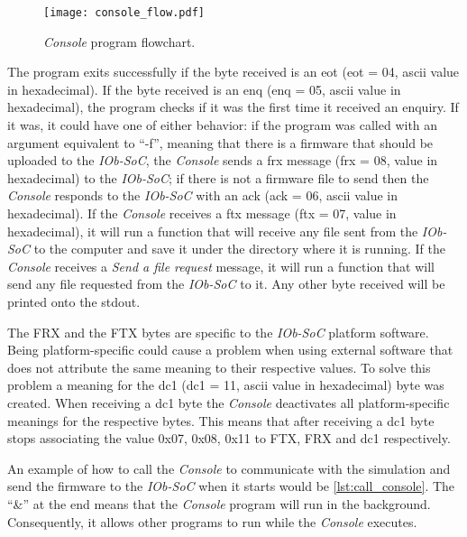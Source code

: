 \begin{figure}[!ht]
    \centering
    \texttt{[image: console\_flow.pdf]}
    \caption{\textit{Console} program flowchart.}
    \label{fig:console_flow}
\end{figure}

The program exits successfully if the byte received is an \acrlong{eot} (\acrshort{eot} = 04, \acrshort{ascii} value in hexadecimal). If the byte received is an \acrlong{enq} (\acrshort{enq} = 05, \acrshort{ascii} value in hexadecimal), the program checks if it was the first time it received an enquiry. If it was, it could have one of either behavior: if the program was called with an argument equivalent to \enquote{-f}, meaning that there is a firmware that should be uploaded to the \textit{IOb-SoC}, the \textit{Console} sends a \acrlong{frx} message (\acrshort{frx} = 08, value in hexadecimal) to the \textit{IOb-SoC}; if there is not a firmware file to send then the \textit{Console} responds to the \textit{IOb-SoC} with an \acrlong{ack} (\acrshort{ack} = 06, \acrshort{ascii} value in hexadecimal). If the \textit{Console} receives a \acrlong{ftx} message (\acrshort{ftx} = 07, value in hexadecimal), it will run a function that will receive any file sent from the \textit{IOb-SoC} to the computer and save it under the directory where it is running. If the \textit{Console} receives a \textit{Send a file request} message, it will run a function that will send any file requested from the \textit{IOb-SoC} to it. Any other byte received will be printed onto the stdout.

The FRX and the FTX bytes are specific to the \textit{IOb-SoC} platform software. Being platform-specific could cause a problem when using external software that does not attribute the same meaning to their respective values. To solve this problem a meaning for the \acrlong{dc1} (\acrshort{dc1} = 11, \acrshort{ascii} value in hexadecimal) byte was created. When receiving a \acrshort{dc1} byte the \textit{Console} deactivates all platform-specific meanings for the respective bytes. This means that after receiving a \acrshort{dc1} byte stops associating the value 0x07, 0x08, 0x11 to FTX, FRX and \acrshort{dc1} respectively. 

An example of how to call the \textit{Console} to communicate with the simulation and send the firmware to the \textit{IOb-SoC} when it starts would be \ref{lst:call_console}. The \enquote{\&} at the end means that the \textit{Console} program will run in the background. Consequently, it allows other programs to run while the \textit{Console} executes.

